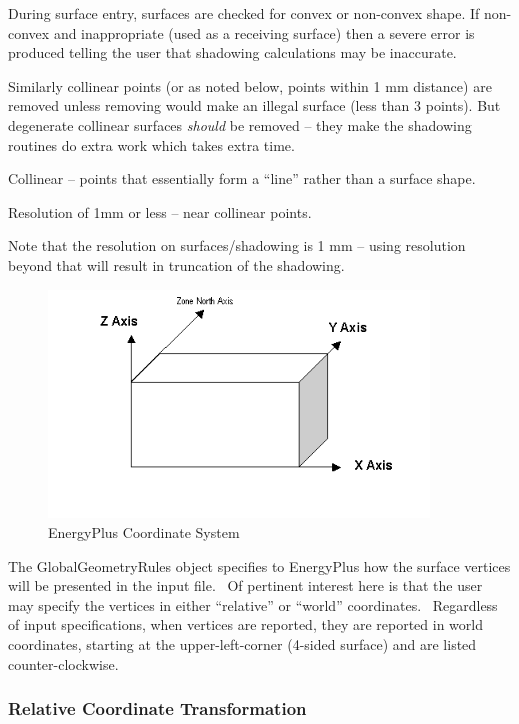 During surface entry, surfaces are checked for convex or non-convex shape. If non-convex and inappropriate (used as a receiving surface) then a severe error is produced telling the user that shadowing calculations may be inaccurate.

Similarly collinear points (or as noted below, points within 1 mm distance) are removed unless removing would make an illegal surface (less than 3 points). But degenerate collinear surfaces \emph{should} be removed -- they make the shadowing routines do extra work which takes extra time.

Collinear -- points that essentially form a ``line'' rather than a surface shape.

Resolution of 1mm or less -- near collinear points.

Note that the resolution on surfaces/shadowing is 1 mm -- using resolution beyond that will result in truncation of the shadowing.

\begin{figure}[hbtp] %
\centering
\includegraphics[width=0.9\textwidth, height=0.9\textheight, keepaspectratio=true]{media/image605.png}
\caption{EnergyPlus Coordinate System \protect \label{fig:energyplus-coordinate-system}}
\end{figure}

The GlobalGeometryRules object specifies to EnergyPlus how the surface vertices will be presented in the input file.~ Of pertinent interest here is that the user may specify the vertices in either ``relative'' or ``world'' coordinates.~ Regardless of input specifications, when vertices are reported, they are reported in world coordinates, starting at the upper-left-corner (4-sided surface) and are listed counter-clockwise.

\subsubsection{Relative Coordinate Transformation}\label{relative-coordinate-transformation}

